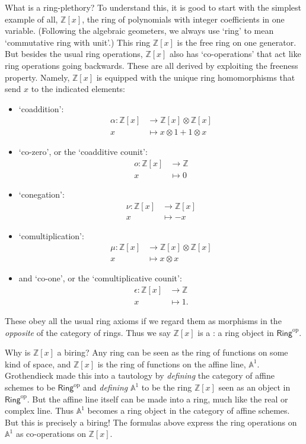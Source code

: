 \documentclass[12pt,reqno]{amsart}
\theoremstyle{plain}
\theoremstyle{definition}
\theoremstyle{remark}
\newcommand{\define}[1]{{\bf \boldmath{#1}}\index{#1}}
\newcommand{\maps}{\colon}
\newcommand{\op}{^\mathrm{op}}
\newcommand{\A}{\mathbb A}
\newcommand{\Z}{\mathbb Z}
\newcommand{\namedcat}[1]{\mathsf{#1}}
\newcommand{\Ring}{\namedcat{Ring}}
\numberwithin{thm}{section}
\begin{document}
What is a ring-plethory? To understand this, it is good to start with the simplest example of all, $\Z[x]$, the ring of polynomials with integer coefficients in one variable. (Following the algebraic geometers, we always use `ring' to mean `commutative ring with unit'.) This ring $\Z[x]$ is the free ring on one generator. But besides the usual ring operations, $\Z[x]$ also has `co-operations' that act like ring operations going backwards. These are all derived by exploiting the freeness property. Namely, $\Z[x]$ is equipped with the unique ring homomorphisms that send $x$ to the indicated elements:
\begin{itemize}
    \item `coaddition':
    \begin{align*}
        \alpha \maps \Z[x] &\to \Z[x] \otimes \Z[x]
        \\
        x & \mapsto x \otimes 1 + 1 \otimes x
    \end{align*}
    \item `co-zero', or the `coadditive counit':
    \begin{align*}
        o \maps \Z[x] &\to \Z
        \\
        x & \mapsto 0
    \end{align*}
      \item `conegation':
    \begin{align*}
        \nu \maps \Z[x] &\to
        \Z[x] 
        \\
        x & \mapsto - x
    \end{align*}
    \item `comultiplication':
    \begin{align*}
        \mu \maps \Z[x] &\to \Z[x] \otimes \Z[x]
        \\
        x & \mapsto x \otimes x
    \end{align*}
    \item and `co-one', or the `comultiplicative counit':
    \begin{align*}
        \epsilon \maps \Z[x] &\to \Z
        \\
        x & \mapsto 1.
    \end{align*}
\end{itemize}
These obey all the usual ring axioms if we regard them as morphisms in the \emph{opposite} of the category of rings. Thus we say $\Z[x]$ is a \define{biring}: a ring object in $\Ring\op$.

Why is $\Z[x]$ a biring? Any ring can be seen as the ring of functions on some kind of space, and $\Z[x]$ is the ring of functions on the affine line, $\A^1$. Grothendieck made this into a tautology by \emph{defining} the category of affine schemes to be $\Ring\op$ and \emph{defining} $\A^1$ to be the ring $\Z[x]$ seen as an object in $\Ring\op$. But the affine line itself can be made into a ring, much like the real or complex line. Thus $\A^1$ becomes a ring object in the category of affine schemes. But this is precisely a biring! The formulas above express the ring operations on $\A^1$ as co-operations on $\Z[x]$.
\end{document}
